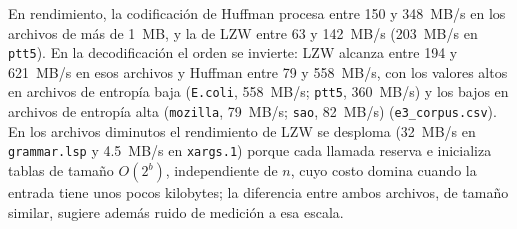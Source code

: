 En rendimiento, la codificación de Huffman procesa entre 150 y 348~MB/s en los archivos de más
de 1~MB, y la de LZW entre 63 y 142~MB/s (203~MB/s en \texttt{ptt5}). En la decodificación el
orden se invierte: LZW alcanza entre 194 y 621~MB/s en esos archivos y Huffman entre 79 y
558~MB/s, con los valores altos en archivos de entropía baja (\texttt{E.coli}, 558~MB/s;
\texttt{ptt5}, 360~MB/s) y los bajos en archivos de entropía alta (\texttt{mozilla}, 79~MB/s;
\texttt{sao}, 82~MB/s) (\texttt{e3\_corpus.csv}). En los archivos diminutos el rendimiento de
LZW se desploma (32~MB/s en \texttt{grammar.lsp} y 4.5~MB/s en \texttt{xargs.1}) porque
cada llamada reserva e inicializa tablas de tamaño $O(2^b)$, independiente de $n$, cuyo costo
domina cuando la entrada tiene unos pocos kilobytes; la diferencia entre ambos archivos, de
tamaño similar, sugiere además ruido de medición a esa escala.
